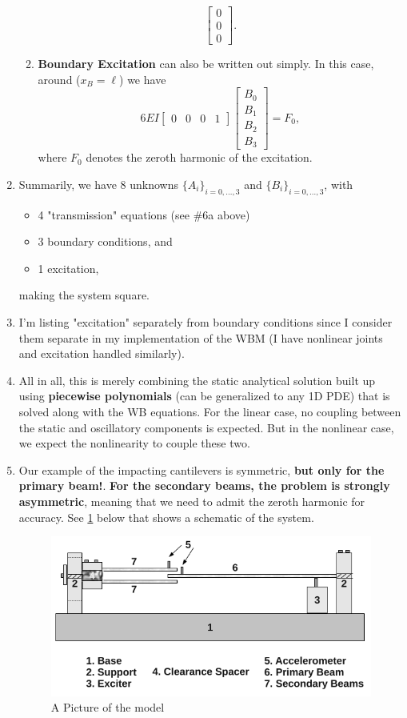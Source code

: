 \documentclass[11pt]{article}
\begin{document}
\begin{enumerate}
\begin{enumerate}
$$      \begin{bmatrix} 0\\ 0\\ 0 \end{bmatrix}. $$
\item \textbf{Boundary Excitation} can also be written out simply. In this case, around (\(x_B=\ell\)) we have
$$ 6 E I \begin{bmatrix} 0 & 0 & 0 & 1\end{bmatrix}
      \begin{bmatrix} B_0\\ B_1\\ B_2\\ B_3 \end{bmatrix} = F_0, $$
  where \(F_0\) denotes the zeroth harmonic of the excitation.
\end{enumerate}
\item Summarily, we have 8 unknowns \(\{A_i\}_{i=0,\dots,3}\) and \(\{B_i\}_{i=0,\dots,3}\), with
\begin{itemize}
\item 4 "transmission" equations (see \#6a above)
\item 3 boundary conditions, and
\item 1 excitation,
\end{itemize}
making the system square.
\item I'm listing "excitation" separately from boundary conditions since I consider them separate in my implementation of the WBM (I have nonlinear joints and excitation handled similarly).
\item All in all, this is merely combining the static analytical solution built up using \textbf{piecewise polynomials} (can be generalized to any 1D PDE) that is solved along with the WB equations.
For the linear case, no coupling between the static and oscillatory components is expected.
But in the nonlinear case, we expect the nonlinearity to couple these two.
\item Our example of the impacting cantilevers is symmetric, \textbf{but only for the primary beam!}.
\textbf{For the secondary beams, the problem is strongly asymmetric}, meaning that we need to admit the zeroth harmonic for accuracy.
See \ref{fig:org606fac5} below that shows a schematic of the system.
\begin{figure}[htbp]
\centering
\includegraphics[width=.9\linewidth]{../../docs/FIGS/iclbeamsetup.png}
\caption{\label{fig:org606fac5}A Picture of the model}
\end{figure}
\end{enumerate}
\end{document}
